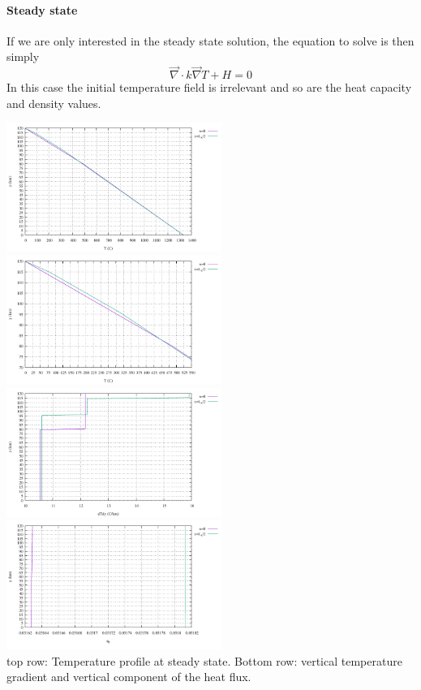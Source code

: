 \paragraph{Steady state} 
If we are only interested in the steady state solution, the equation to solve is then 
simply 
\[
\vec\nabla \cdot k \vec\nabla T + H = 0 
\]
In this case the initial temperature field is irrelevant and so are the heat capacity 
and density values. 
\begin{center}
\includegraphics[width=7cm]{python_codes/fieldstone_86/results/profile_T.pdf}
\includegraphics[width=7cm]{python_codes/fieldstone_86/results/profile_T_top.pdf}\\
\includegraphics[width=7cm]{python_codes/fieldstone_86/results/profile_dTdy.pdf}
\includegraphics[width=7cm]{python_codes/fieldstone_86/results/profile_qy.pdf}\\
{\captionfont top row: Temperature profile at steady state. Bottom row:
vertical temperature gradient and vertical component of the heat flux.} 
\end{center}


